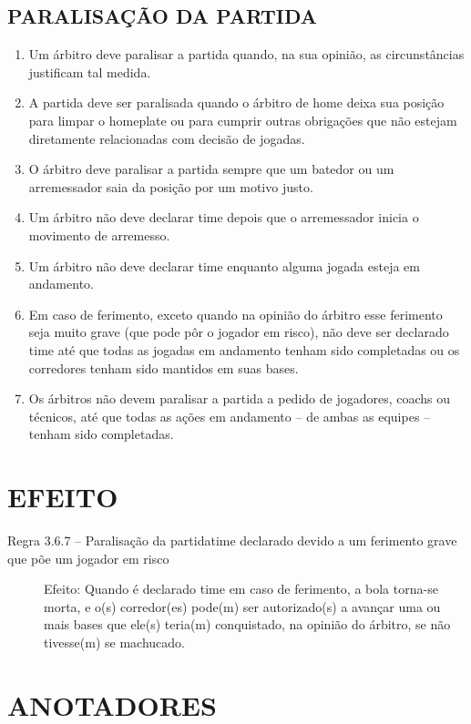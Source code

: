 \subsection{PARALISAÇÃO DA PARTIDA}
\begin{enumerate}[label=(\alph*)]
	\item Um árbitro deve paralisar a partida quando, na sua opinião, as circunstâncias justificam tal medida.
	\item A partida deve ser paralisada quando o árbitro de \gls{home} deixa sua posição	para limpar o \gls{homeplate} ou para cumprir outras obrigações que não estejam diretamente relacionadas com decisão de jogadas.
	\item  O árbitro deve paralisar a partida sempre que um batedor ou um arremessador saia da posição por um motivo justo.
	\item  Um árbitro não deve declarar \gls{time} depois que o arremessador inicia o movimento de arremesso.
	\item  Um árbitro não deve declarar \gls{time} enquanto alguma jogada esteja em  andamento.
	\item  Em caso de ferimento, exceto quando na opinião do árbitro esse ferimento seja muito grave (que pode pôr o jogador em risco), não deve ser declarado \gls{time} até que todas as jogadas em andamento tenham sido completadas ou os corredores tenham sido mantidos em suas bases.
	\item   Os árbitros não devem paralisar a partida a pedido de jogadores, \glspl{coach}
	 ou técnicos, até que todas as ações em andamento -- de ambas as equipes --
	 tenham sido completadas.
\end{enumerate}

\section*{EFEITO}

\begin{description}
	\item[Regra 3.6.7 -- Paralisação da partida\gls{time} declarado devido a um ferimento grave que põe um jogador em risco] Efeito: Quando é declarado \gls{time} em caso de ferimento, a bola torna-se morta, e o(s) corredor(es) pode(m) ser autorizado(s) a avançar uma ou mais bases que ele(s) teria(m) conquistado, na opinião do árbitro, se não tivesse(m) se machucado.
\end{description}

\section{ANOTADORES}


